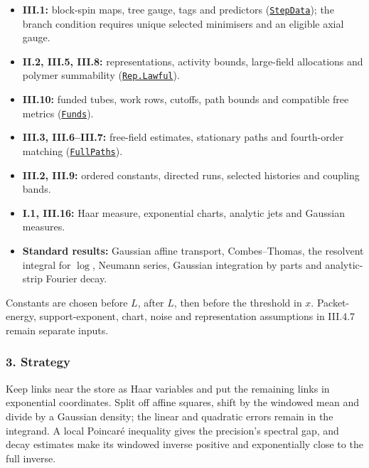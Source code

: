 \documentclass[
  letterpaper,
  11pt]{article}
\providecommand{\tightlist}{%
  \setlength{\itemsep}{0pt}\setlength{\parskip}{0pt}}
\begin{document}
\begin{itemize}
\tightlist
\item
  \textbf{III.1:} block-spin maps, tree gauge, tags and predictors
  (\href{https://github.com/yang-mills-group/OpenAI-YM-20261028/blob/3456e5e75cf8d4cd558955a5c7638fba2d68f464/YM/RG/Block.lean\#L22-L25}{\texttt{StepData}});
  the branch condition requires unique selected minimisers and an
  eligible axial gauge.
\item
  \textbf{II.2, III.5, III.8:} representations, activity bounds,
  large-field allocations and polymer summability
  (\href{https://github.com/yang-mills-group/OpenAI-YM-20261028/blob/3456e5e75cf8d4cd558955a5c7638fba2d68f464/YM/RG/History.lean\#L181-L183}{\texttt{Rep.Lawful}}).
\item
  \textbf{III.10:} funded tubes, work rows, cutoffs, path bounds and
  compatible free metrics
  (\href{https://github.com/yang-mills-group/OpenAI-YM-20261028/blob/3456e5e75cf8d4cd558955a5c7638fba2d68f464/YM/Pressure/Seeds.lean\#L101-L109}{\texttt{Funds}}).
\item
  \textbf{III.3, III.6--III.7:} free-field estimates, stationary paths
  and fourth-order matching
  (\href{https://github.com/yang-mills-group/OpenAI-YM-20261028/blob/3456e5e75cf8d4cd558955a5c7638fba2d68f464/YM/Next/STATIONARY/Level/Recurse.lean\#L301-L305}{\texttt{FullPaths}}).
\item
  \textbf{III.2, III.9:} ordered constants, directed runs, selected
  histories and coupling bands.
\item
  \textbf{I.1, III.16:} Haar measure, exponential charts, analytic jets
  and Gaussian measures.
\item
  \textbf{Standard results:} Gaussian affine transport, Combes--Thomas,
  the resolvent integral for \(\log\), Neumann series, Gaussian
  integration by parts and analytic-strip Fourier decay.
\end{itemize}

Constants are chosen before \(L\), after \(L\), then before the
threshold in \(x\). Packet-energy, support-exponent, chart, noise and
representation assumptions in III.4.7 remain separate inputs.

\subsubsection{3. Strategy}\label{strategy-6}

Keep links near the store as Haar variables and put the remaining links
in exponential coordinates. Split off affine squares, shift by the
windowed mean and divide by a Gaussian density; the linear and quadratic
errors remain in the integrand. A local Poincaré inequality gives the
precision's spectral gap, and decay estimates make its windowed inverse
positive and exponentially close to the full inverse.
\end{document}
